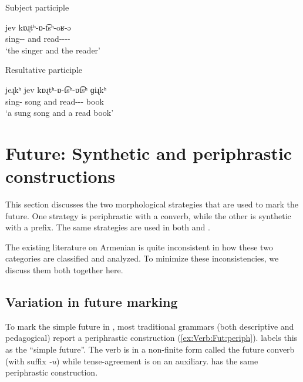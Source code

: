 	
	\begin{exe}
		\ex \label{sent:participles:ex}
		\begin{xlist}
			\ex Subject participle
			
			 jev {kɒɻtʰ-ɒ-t͡sʰ-oʁ-ə}
			\\
			sing-{\sptcp}-{} and 	read-{\thgloss}-{\aorother}-{\sptcp}-{}
			\\
			\trans `the singer and the reader'
			\\
			
			\pagebreak\ex Resultative participle
			
			 {jeɻkʰ } jev {kɒɻtʰ-ɒ-t͡sʰ-ɒt͡sʰ} {ɡiɻkʰ} %
			\\
			sing-{\rptcp} song and read-{\thgloss}-{\aorother}-{\rptcp} book
			\\
			\trans 		`a sung song and a read book'
			\\
		\end{xlist}
		
	\end{exe}

	\section{Future: Synthetic and periphrastic constructions}\label{section:verb:fut}
This section discusses the two morphological strategies that are used to mark the future. One strategy is periphrastic with a converb, while the other is synthetic with a prefix. The same strategies are used in both {\seaSEA} and {\iaIA}. 

The existing literature on Armenian is quite inconsistent in how these two categories are classified and analyzed. To minimize these inconsistencies, we discuss them both together here. 

\subsection{Variation in future marking}\label{section:verb:fut:vary}
To mark the simple future in {\seaSEA}, most traditional grammars (both descriptive and pedagogical) report a periphrastic construction (\ref{ex:Verb:Fut:periph}). \citet[233]{DumTragut-2009-ArmenianReferenceGrammar} labels this as the “simple future”. The verb is in a non-finite form called the future converb (with suffix \textit{-u}) while tense-agreement is on an auxiliary. {\iaIA} has the same periphrastic construction. 

